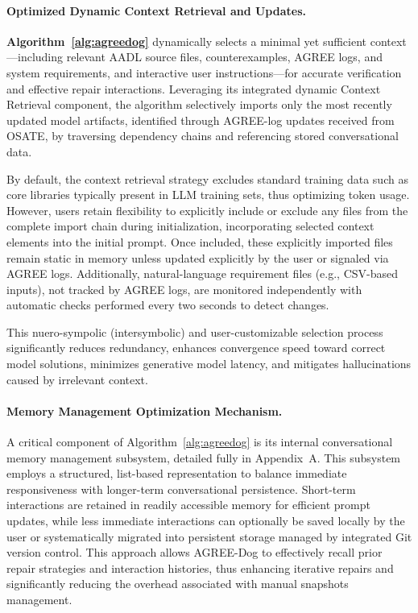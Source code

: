 \paragraph{Optimized Dynamic Context Retrieval and Updates.}
\textbf{Algorithm~\ref{alg:agreedog}} dynamically selects a minimal yet sufficient context—including relevant AADL source files, counterexamples, AGREE logs, and system requirements, and interactive user instructions—for accurate verification and effective repair interactions. Leveraging its integrated dynamic Context Retrieval component, the algorithm selectively imports only the most recently updated model artifacts, identified through AGREE-log updates received from OSATE, by traversing dependency chains and referencing stored conversational data.

By default, the context retrieval strategy excludes standard training data such as core libraries typically present in LLM training sets, thus optimizing token usage. However, users retain flexibility to explicitly include or exclude any files from the complete import chain during initialization, incorporating selected context elements into the initial prompt. Once included, these explicitly imported files remain static in memory unless updated explicitly by the user or signaled via AGREE logs. Additionally, natural-language requirement files (e.g., CSV-based inputs), not tracked by AGREE logs, are monitored independently with automatic checks performed every two seconds to detect changes.

This nuero-sympolic (intersymbolic) and user-customizable selection process significantly reduces redundancy, enhances convergence speed toward correct model solutions, minimizes generative model latency, and mitigates hallucinations caused by irrelevant context.



\paragraph{Memory Management Optimization Mechanism.}

A critical component of Algorithm~\ref{alg:agreedog} is its internal conversational memory management subsystem, detailed fully in Appendix~A. This subsystem employs a structured, list-based representation to balance immediate responsiveness with longer-term conversational persistence. Short-term interactions are retained in readily accessible memory for efficient prompt updates, while less immediate interactions can optionally be saved locally by the user or systematically migrated into persistent storage managed by integrated Git version control. This approach allows AGREE-Dog to effectively recall prior repair strategies and interaction histories, thus enhancing iterative repairs and significantly reducing the overhead associated with manual snapshots management.

